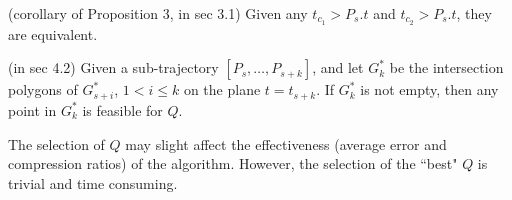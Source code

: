 \begin{cor}
    (corollary of Proposition 3, in sec 3.1) Given any $t_{c_1}> P_s.t$ and $t_{c_2} > P_s.t$, they are equivalent.
\end{cor}

(in sec 4.2) Given a sub-trajectory ${[P_s, \ldots, P_{s+k}]}$, and let $G^*_k$ be the intersection polygons of $G^*_{s+i}$, $1<i\le k$ on the plane $t=t_{s+k}$. If $G^*_k$ is not empty, then any point in $G^*_k$ is feasible for $Q$.

The selection of $Q$ may slight affect the effectiveness (\eg average error and compression ratios) of the algorithm. However, the selection of the ``best" $Q$ is trivial and time consuming.


